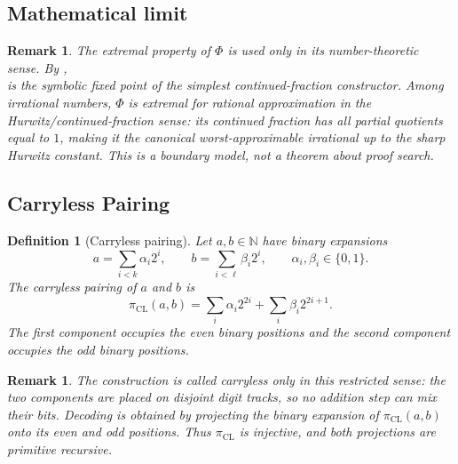 \documentclass[letterpaper,10pt]{article}
\theoremstyle{upright}
\theoremstyle{upright}
\newtheorem{remark}[theorem]{Remark}
\newtheorem{definition}[theorem]{Definition}
\begin{document}
\subsection{Mathematical limit}\label{subsec:mathematical-limit}

\begin{remark}
	The extremal property of $\Phi$ is used only in its number-theoretic sense. By \cite{hurwitz1891},
	\begin{equation}
		[\;1;1,1,\ldots\;]
	\end{equation}
	is the symbolic fixed point of the simplest continued-fraction constructor. Among irrational numbers, $\Phi$ is extremal for rational approximation in the Hurwitz/continued-fraction sense: its continued fraction has all partial quotients equal to $1$, making it the canonical worst-approximable irrational up to the sharp Hurwitz constant. This is a boundary model, not a theorem about proof search.
\end{remark}

\subsection{Carryless Pairing}\label{subsec:carryless-pairing}

\begin{definition}[Carryless pairing]
	Let $a,b\in\mathbb{N}$ have binary expansions
	\begin{equation}
		a=\sum_{i<k}\alpha_i2^i,\qquad b=\sum_{i<\ell}\beta_i2^i,\qquad \alpha_i,\beta_i\in\{0,1\}.
	\end{equation}
	The carryless pairing of $a$ and $b$ is
	\begin{equation}
		\pi_{\mathrm{CL}}(a,b)=\sum_i \alpha_i2^{2i}+\sum_i \beta_i2^{2i+1}.
	\end{equation}
	The first component occupies the even binary positions and the second component occupies the odd binary positions.
\end{definition}

\begin{remark}
	The construction is called carryless only in this restricted sense: the two components are placed on disjoint digit tracks, so no addition step can mix their bits. Decoding is obtained by projecting the binary expansion of $\pi_{\mathrm{CL}}(a,b)$ onto its even and odd positions. Thus $\pi_{\mathrm{CL}}$ is injective, and both projections are primitive recursive.
\end{remark}
\end{document}
